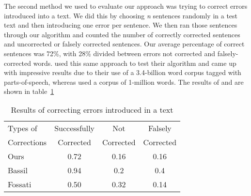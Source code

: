 \documentclass[twocolumn]{article}
\begin{document}
The second method we used to evaluate our approach was trying to correct errors
introduced into a text. We did this by choosing \emph{n} sentences randomly in a
test text and then introducing one error per sentence. We then ran those
sentences through our algorithm and counted the number of correctly corrected
sentences and uncorrected or falsely corrected sentences. Our average percentage
of correct sentences was 72\%, with 28\% divided between errors not corrected
and falsely-corrected words. \cite{Bassil12} used this same approach to test
their algorithm and came up with impressive results due to their use of a
3.4-billion word corpus tagged with parts-of-speech, whereas \cite{Fossati07}
used a corpus of 1-million words. The results of \cite{Bassil12} and
\cite{Fossati07} are shown in table~\ref{text}

\begin{table}[t]
    \centering
    \begin{tabular}{ | l | c | c | c | }
        \hline
        Types of & Successfully & Not & Falsely \\
        Corrections & Corrected & Corrected & Corrected \\
        \hline
        Ours & 0.72 & 0.16 & 0.16 \\
        \hline
        Bassil\cite{Bassil12} & 0.94 & 0.2 & 0.4 \\
        \hline
        Fossati\cite{Fossati07} & 0.50 & 0.32 & 0.14 \\
        \hline
    \end{tabular}
    \caption{Results of correcting errors introduced in a text}
    \label{text}
\end{table}
\end{document}
